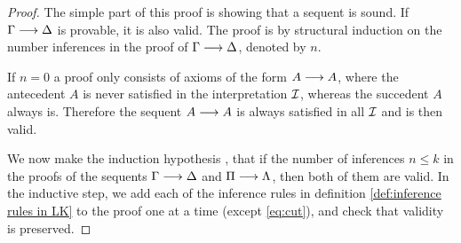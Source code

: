 \documentclass[11pt,a4paper]{article}
\begin{document}
\begin{proof}
    The simple part of this proof is showing that a sequent is sound.
    If \(\Gamma\longrightarrow\Delta\) is provable, it is also valid.
    The proof is by structural induction on the number inferences
    in the proof of \(\Gamma\longrightarrow\Delta\), denoted by \(n\).

    If \(n=0\) a proof only consists of axioms of the form \(A\longrightarrow A\),
    where the antecedent \(A\) is never satisfied in the interpretation
    \(\mathcal{I}\), whereas the succedent \(A\) always is. Therefore the
    sequent \(A\longrightarrow A\) is always satisfied in all \(\mathcal{I}\) and is then valid.

    We now make the induction hypothesis \IH, that if the number of inferences
    \(n\leq k\) in the proofs of the sequents \(\Gamma\longrightarrow\Delta\) and \(\Pi\longrightarrow\Lambda\),
    then both of them are valid. In the inductive step, we add each of the inference
    rules in definition \ref{def:inference rules in LK} to the proof one at a time
    (except \eqref{eq:cut}), and check that validity is preserved.


\end{proof}
\end{document}
